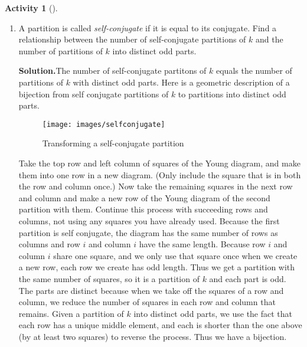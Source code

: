 \documentclass[10pt,]{book}
\theoremstyle{plain}
\theoremstyle{definition}
\newtheorem{activity}[project]{Activity}
\numberwithin{equation}{chapter}
\begin{document}
\begin{activity}[]\label{activity-88}
~\par
\begin{enumerate}[label=(\alph*)]
 \item A partition is called \emph{self-conjugate} if it is equal to its conjugate. Find a relationship between the number of self-conjugate partitions of \(k\) and the number of partitions of \(k\) into distinct odd parts.%
\par\medskip\noindent%
\textbf{Solution.}\quad The number of self-conjugate partitons of \(k\) equals the number of partitions of \(k\) with distinct odd parts. Here is a geometric description of a bijection from self conjugate partitions of \(k\) to partitions into distinct odd parts.%
\begin{figure}
\centering
\texttt{[image: images/selfconjugate]}
\caption{Transforming a self-conjugate partition\label{selfconjugate-to-distinctodd}}
\end{figure}
Take the top row and left column of squares of the Young diagram, and make them into one row in a new diagram. (Only include the square that is in both the row and column once.) Now take the remaining squares in the next row and column and make a new row of the Young diagram of the second partition with them. Continue this process with succeeding rows and columns, not using any squares you have already used. Because the first partition is self conjugate, the diagram has the same number of rows as columns and row \(i\) and column \(i\) have the same length. Because row \(i\) and column \(i\) share one square, and we only use that square once when we create a new row, each row we create has odd length. Thus we get a partition with the same number of squares, so it is a partition of \(k\) and each part is odd. The parts are distinct because when we take off the squares of a row and column, we reduce the number of squares in each row and column that remains. Given a partition of \(k\) into distinct odd parts, we use the fact that each row has a unique middle element, and each is shorter than the one above (by at least two squares) to reverse the process. Thus we have a bijection.%


\end{enumerate}
\end{activity}
\end{document}
